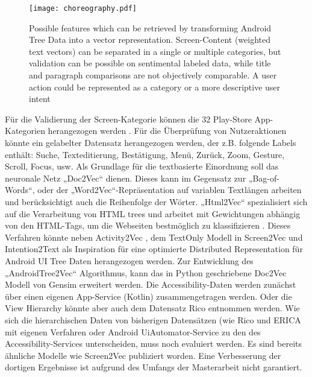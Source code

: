 \begin{figure}[htbp!]
  \centering
  \texttt{[image: choreography.pdf]}
  \caption{Possible features which can be retrieved by transforming Android Tree Data into a vector representation. Screen-Content (weighted text vectors) can be separated in a single or multiple categories, but validation can be possible on sentimental labeled data, while title and paragraph comparisons are not objectively comparable. A user action could be represented as a category or a more descriptive user intent}
  \label{fig:encode-decode}
\end{figure}

Für die Validierung der Screen-Kategorie können die 32 Play-Store App-Kategorien herangezogen werden \cite{google2023appCategory}. Für die Überprüfung von Nutzeraktionen könnte ein gelabelter Datensatz herangezogen werden, der z.B. folgende Labels enthält: Suche, Texteditierung, Bestätigung, Menü, Zurück, Zoom, Gesture, Scroll, Focus, usw.
Als Grundlage für die textbasierte Einordnung soll das neuronale Netz „Doc2Vec“ \cite{wu2022distributed} dienen. Dieses kann im Gegensatz zur „Bag-of-Words“, oder der „Word2Vec“-Repräsentation auf variablen Textlängen arbeiten und berücksichtigt auch die Reihenfolge der Wörter. „Html2Vec“ spezialisiert sich auf die Verarbeitung von HTML trees und arbeitet mit Gewichtungen abhängig von den HTML-Tags, um die Webseiten bestmöglich zu klassifizieren \cite{wu2022distributed}. Dieses Verfahren könnte neben Activity2Vec \cite{ghods2019activity2vec}, dem TextOnly Modell in Screen2Vec \cite{li2021screen2vec} und Intention2Text \cite{yu2020understanding} als Inspiration für eine optimierte Distributed Representation für Android UI Tree Daten herangezogen werden.
Zur Entwicklung des „AndroidTree2Vec“ Algorithmus, kann das in Python geschriebene Doc2Vec Modell von Gensim \cite{rare2023gensim} erweitert werden. Die Accessibility-Daten werden zunächst über einen eigenen App-Service (Kotlin) zusammengetragen werden. Oder die View Hierarchy könnte aber auch dem Datensatz Rico \cite{deka2017rico} entnommen werden. Wie sich die hierarchischen Daten von bisherigen Datensätzen (wie Rico und ERICA \cite{deka2016erica} mit eigenen Verfahren oder Android UiAutomator-Service \cite{google2023uiAutomator} zu den des Accessibility-Services unterscheiden, muss noch evaluiert werden. 
Es sind bereits ähnliche Modelle wie Screen2Vec \cite{li2021screen2vec} publiziert worden. Eine Verbesserung der dortigen Ergebnisse ist aufgrund des Umfangs der Masterarbeit nicht garantiert.
